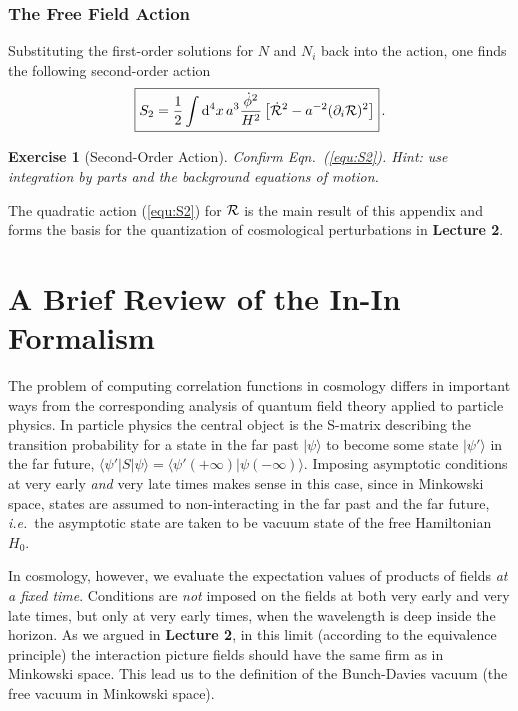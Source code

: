 \documentclass[12pt,letterpaper,rotate]{article}
\def\beq{\begin{equation}}
\def\eeq{\end{equation}}
\def\d{{\rm d}}
\def\R{{\cal R}}
\newtheorem{thm}{Exercise}
\begin{document}
{\subsubsection{The Free Field Action}


Substituting the first-order solutions for $N$ and $N_i$ back into the action, one finds the following second-order action
 \cite{malda}
\beq
\label{equ:S2}
\fbox{$\displaystyle
S_2 = \frac{1}{2} \int \d^4 x \, a^3 \frac{\dot \phi^2}{H^2} \left[ \dot \R^2 - a^{-2} (\partial_i \R)^2 \right] $}\, .%
\eeq

\begin{thm}[Second-Order Action]
 Confirm Eqn.~(\ref{equ:S2}). Hint: use integration by parts and the background equations of motion.
 \end{thm}
 
 The quadratic action (\ref{equ:S2}) for $\R$ is the main result of this appendix and forms the basis for the quantization of cosmological perturbations in {\bf Lecture 2}.

\newpage
\section{A Brief Review of the In-In Formalism}
\label{sec:inin}

The problem of computing correlation functions in cosmology differs in important ways from the corresponding analysis of quantum field theory applied to particle physics.
In particle physics the central object is the S-matrix describing the transition probability  for a state in the far past $|\psi\rangle$ to become some state $|
\psi' \rangle $ in the far future, $\langle \psi' | S | \psi \rangle = \langle \psi'(+\infty) | \psi(- \infty) \rangle$. Imposing asymptotic conditions at very early {\it and} very late times makes sense in this case, since in Minkowski space, states are assumed to non-interacting in the far past and the far future, {\it i.e.}~the asymptotic state are taken to be vacuum state of the free Hamiltonian $H_0$.

In cosmology, however, we evaluate the expectation values of products of fields {\it at a fixed time}. Conditions are {\it not} imposed on the fields at both very early and very late times, but only at very early times, when the wavelength is deep inside the horizon.
As we argued in {\bf Lecture 2}, in this limit (according to the equivalence principle) the interaction picture fields should have the same firm as in Minkowski space. This lead us to the definition of the Bunch-Davies vacuum (the free vacuum in Minkowski space).

}
\end{document}
